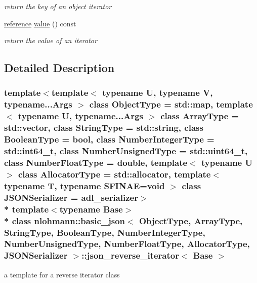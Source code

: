 \begin{DoxyCompactItemize}
\begin{DoxyCompactList}\small\item\em return the key of an object iterator \end{DoxyCompactList}\item 
\hyperlink{classnlohmann_1_1basic__json_1_1json__reverse__iterator_ab0021ef2007fd338615360af404dcd4e}{reference} \hyperlink{classnlohmann_1_1basic__json_1_1json__reverse__iterator_af2992054234f77bf199642ccaee47b45}{value} () const \hypertarget{classnlohmann_1_1basic__json_1_1json__reverse__iterator_af2992054234f77bf199642ccaee47b45}{}\label{classnlohmann_1_1basic__json_1_1json__reverse__iterator_af2992054234f77bf199642ccaee47b45}

\begin{DoxyCompactList}\small\item\em return the value of an iterator \end{DoxyCompactList}\end{DoxyCompactItemize}


\subsection{Detailed Description}
\subsubsection*{template$<$template$<$ typename U, typename V, typename...\+Args $>$ class Object\+Type = std\+::map, template$<$ typename U, typename...\+Args $>$ class Array\+Type = std\+::vector, class String\+Type = std\+::string, class Boolean\+Type = bool, class Number\+Integer\+Type = std\+::int64\+\_\+t, class Number\+Unsigned\+Type = std\+::uint64\+\_\+t, class Number\+Float\+Type = double, template$<$ typename U $>$ class Allocator\+Type = std\+::allocator, template$<$ typename T, typename S\+F\+I\+N\+A\+E=void $>$ class J\+S\+O\+N\+Serializer = adl\+\_\+serializer$>$\\*
template$<$typename Base$>$\\*
class nlohmann\+::basic\+\_\+json$<$ Object\+Type, Array\+Type, String\+Type, Boolean\+Type, Number\+Integer\+Type, Number\+Unsigned\+Type, Number\+Float\+Type, Allocator\+Type, J\+S\+O\+N\+Serializer $>$\+::json\+\_\+reverse\+\_\+iterator$<$ Base $>$}

a template for a reverse iterator class 


